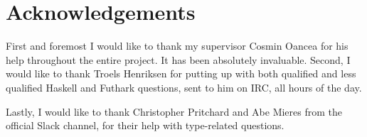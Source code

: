 \clearpage

\chapter*{Acknowledgements}
First and foremost I would like to thank my supervisor Cosmin Oancea for his
help throughout the entire project. It has been absolutely invaluable.
Second, I would like to thank Troels Henriksen for putting up with both
qualified and less qualified Haskell and Futhark questions, sent to him on IRC, all hours
of the day.

Lastly, I would like to thank Christopher Pritchard and Abe Mieres from the
official \fsharp{} Slack channel, for their help with type-related \fsharp{}
questions.

